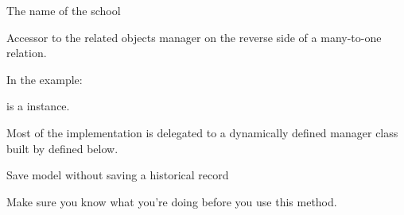 \documentclass[letterpaper,10pt,english]{sphinxmanual}
\begin{document}
\begin{fulllineitems}
\begin{fulllineitems}
\label{\detokenize{modules/models:users.models.School.name}}
The name of the school

\end{fulllineitems}


\begin{fulllineitems}
\label{\detokenize{modules/models:users.models.School.objects}}
\end{fulllineitems}


\begin{fulllineitems}
\label{\detokenize{modules/models:users.models.School.profile_set}}
Accessor to the related objects manager on the reverse side of a
many-to-one relation.

In the example:

\begin{sphinxVerbatim}[commandchars=\\\{\}]
 
       
\end{sphinxVerbatim}

 is a  instance.

Most of the implementation is delegated to a dynamically defined manager
class built by  defined below.

\end{fulllineitems}


\begin{fulllineitems}
\label{\detokenize{modules/models:users.models.School.save_without_historical_record}}
Save model without saving a historical record

Make sure you know what you’re doing before you use this method.

\end{fulllineitems}


\end{fulllineitems}
\end{document}
